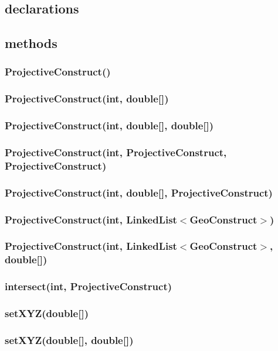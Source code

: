 \documentclass[a4paper,10pt]{report}
\begin{document}
\subsection{declarations}
\subsubsection{}
\subsection{methods}
\subsubsection{ProjectiveConstruct()}
\subsubsection{ProjectiveConstruct(int, double[])}
\subsubsection{ProjectiveConstruct(int, double[], double[])}
\subsubsection{ProjectiveConstruct(int, ProjectiveConstruct, ProjectiveConstruct)}
\subsubsection{ProjectiveConstruct(int, double[], ProjectiveConstruct)}
\subsubsection{ProjectiveConstruct(int, LinkedList$<$GeoConstruct$>$)}
\subsubsection{ProjectiveConstruct(int, LinkedList$<$GeoConstruct$>$, double[])}
\subsubsection{intersect(int, ProjectiveConstruct)}
\subsubsection{setXYZ(double[])}
\subsubsection{setXYZ(double[], double[])}
\end{document}
